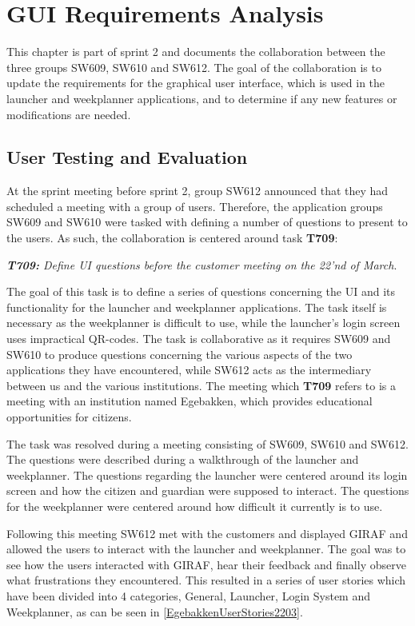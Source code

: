 \chapter{GUI Requirements Analysis}\label{sec:Colab2}
This chapter is part of sprint 2 and documents the collaboration between the
three groups SW609, SW610 and SW612. The goal of the collaboration is to update
the requirements for the graphical user interface, which is used in the launcher
and weekplanner applications, and to determine if any new features or
modifications are needed.

\section{User Testing and Evaluation}
At the sprint meeting before sprint 2, group SW612 announced that they had
scheduled a meeting with a group of users. Therefore, the application groups
SW609 and SW610 were tasked with defining a number of questions to present to
the users. As such, the collaboration is centered around task \textbf{T709}:\nl

\textit{\textbf{T709:} Define UI questions before the customer meeting on the
22'nd of March}.\nl 

The goal of this task is to define a series of questions concerning
the UI and its functionality for the launcher and weekplanner applications. The task itself is necessary as the
weekplanner is difficult to use, while the launcher's login screen uses 
impractical QR-codes. The task is collaborative as it requires SW609 and SW610
to produce questions concerning the various aspects of the two applications they have
encountered, while SW612 acts as the intermediary between us and the various
institutions. The meeting which \textbf{T709} refers to is a meeting with an
institution named Egebakken, which provides educational opportunities for
citizens.\nl

The task was resolved during a meeting consisting of SW609, SW610 and SW612.
The questions were described during a walkthrough of the launcher and
weekplanner. The questions regarding the launcher were centered around its
login screen and how the citizen and guardian were supposed to interact. The
questions for the weekplanner were centered around how difficult it currently
is to use.\nl

Following this meeting SW612 met with the customers and displayed GIRAF and
allowed the users to interact with the launcher and weekplanner. The goal was to
see how the users interacted with GIRAF, hear their feedback and finally
observe what frustrations they encountered. This resulted in a series of user
stories which have been divided into 4 categories, General, Launcher, Login
System and Weekplanner, as can be seen in \autoref{EgebakkenUserStories2203}.


